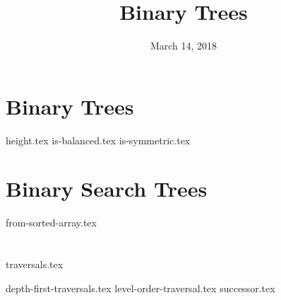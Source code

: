 \documentclass[11pt]{exam}
\title{Binary Trees}
\date{March 14, 2018}
\begin{document}
\maketitle

\section{Binary Trees}
\begin{questions}
{height.tex}
{is-balanced.tex}
\clearpage
{}\vspace*{-2em}
{is-symmetric.tex}
\end{questions}

\clearpage

\section{Binary Search Trees}
\begin{questions}
{from-sorted-array.tex}
\end{questions}

\clearpage

\section{}
{traversals.tex}
\begin{questions}
{depth-first-traversals.tex}
{level-order-traversal.tex}
{successor.tex}
\end{questions}
\end{document}

